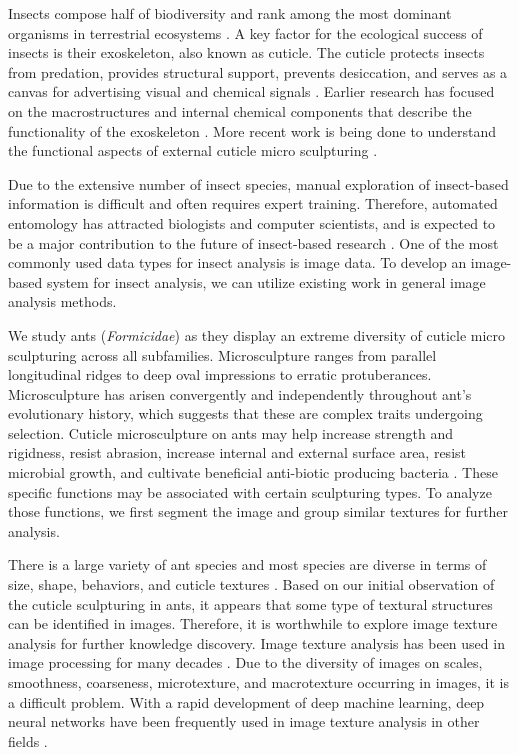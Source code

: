 \documentclass{aci}
\numberwithin{equation}{section}
\begin{document}
Insects compose half of biodiversity and rank among the most dominant organisms
in terrestrial ecosystems \cite{sheikh_diverse_2017}. A key factor for the
ecological success of insects is their exoskeleton, also known as cuticle. The
cuticle protects insects from predation, provides structural support, prevents
desiccation, and serves as a canvas for advertising visual and chemical signals
\cite{gullan_insects_2009}. Earlier research has focused on the macrostructures
and internal chemical components that describe the functionality of the
exoskeleton \cite{gunderson_insect_1989}. More recent work is being done to
understand the functional aspects of external cuticle micro sculpturing
\cite{muthukrishnan_insect_2020, watson_diversity_2017}.

Due to the extensive number of insect species, manual exploration of
insect-based information is difficult and often requires expert training.
Therefore, automated entomology has attracted biologists and computer
scientists, and is expected to be a major contribution to the future of
insect-based research \cite{martineau_survey_2017}. One of the most commonly
used data types for insect analysis is image data. To develop an image-based
system for insect analysis, we can utilize existing work in general
image analysis methods.

We study ants (\textit{Formicidae}) as they display an extreme diversity of
cuticle micro sculpturing across all subfamilies. Microsculpture ranges from
parallel longitudinal ridges to deep oval impressions to erratic protuberances.
Microsculpture has arisen convergently and independently throughout ant's
evolutionary history, which suggests  that these are complex traits undergoing
selection. Cuticle microsculpture on ants may help increase strength and
rigidness, resist abrasion, increase internal and external surface area, resist
microbial growth, and cultivate beneficial anti-biotic producing bacteria
\cite{johnson_effect_2011, bruckner_relationship_2017, currie_coevolved_2006}.
These specific functions may be associated with certain sculpturing types. To
analyze those functions, we first segment the image and group similar textures
for further analysis.

There is a large variety of ant species and most species are diverse in terms of
size, shape, behaviors, and cuticle textures \cite{harris_glossary_1979}. Based
on our initial observation of the cuticle sculpturing in ants, it appears that
some type of textural structures can be identified in images. Therefore, it is
worthwhile to explore image texture analysis for further knowledge discovery.
Image texture analysis has been used in image processing for many decades
\cite{hung_image_2019}. Due to the diversity of images on scales, smoothness,
coarseness, microtexture, and macrotexture occurring in images, it is a
difficult problem. With a rapid development of deep machine learning, deep
neural networks have been frequently used in image texture analysis in other
fields \cite{sun_robust_2014,liu_bow_2019,liu_pestnet_2019}.
\end{document}

